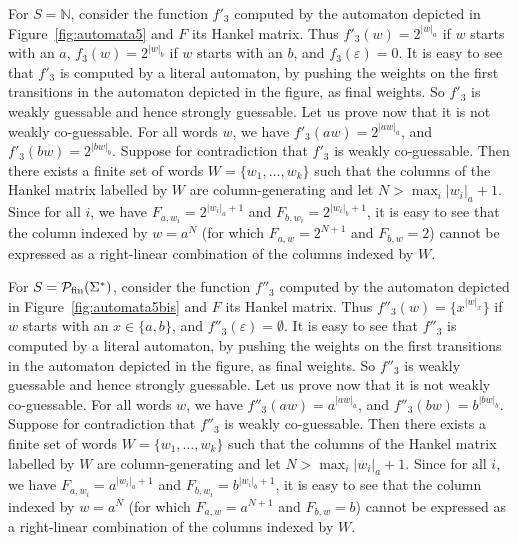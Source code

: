\documentclass[10pt,a4paper]{amsart}
\theoremstyle{definition}
\numberwithin{equation}{section}
\numberwithin{theorem}{section}
\begin{document}
	For $S=\mathbb{N}$, consider the function $f'_3$ computed by the automaton depicted in Figure~\ref{fig:automata5} and $F$ its Hankel matrix. Thus $f'_3(w) = 2^{|w|_a}$ if $w$ starts with an $a$, $f_3(w) = 2^{|w|_b}$ if $w$ starts with an $b$, and $f_3(\varepsilon) = 0$. It is easy to see that $f'_3$ is computed by a literal automaton, by pushing the weights on the first transitions in the automaton depicted in the figure, as final weights. So $f'_3$ is weakly guessable and hence strongly guessable. Let us prove now that it is not weakly co-guessable. For all words $w$, we have $f'_3(aw) = 2^{|aw|_a}$, and $f'_3(bw) = 2^{|bw|_b}$. Suppose for contradiction that $f'_3$ is weakly co-guessable. Then there exists a finite set of words $W=\{w_1, \ldots ,w_k\}$ such that the columns of the Hankel matrix labelled by $W$ are column-generating and let $N> \max_i|w_i|_a + 1$. Since for all $i$, we have $F_{a, w_i} = 2^{|w_i|_a + 1}$ and $F_{b, w_i} = 2^{|w_i|_b+1}$, it is easy to see that the column indexed by $w = a^N$ (for which $F_{a, w} = 2^{N+1}$ and $F_{b, w} = 2$) cannot be expressed as a right-linear combination of the columns indexed by $W$.
	
	For $S=\mathcal{P}_{\rm fin}(\Sigma^*)$, consider the function $f''_3$ computed by the automaton depicted in Figure~\ref{fig:automata5bis} and $F$ its Hankel matrix. Thus $f''_3(w) = \{x^{|w|_x}\}$ if $w$ starts with an $x \in \{a,b\}$, and $f''_3(\varepsilon) = \emptyset$. It is easy to see that $f''_3$ is computed by a literal automaton, by pushing the weights on the first transitions in the automaton depicted in the figure, as final weights. So $f''_3$ is weakly guessable and hence strongly guessable. Let us prove now that it is not weakly co-guessable. For all words $w$, we have $f''_3(aw) = a^{|aw|_a}$, and $f''_3(bw) = b^{|bw|_b}$. Suppose for contradiction that $f''_3$ is weakly co-guessable. Then there exists a finite set of words $W=\{w_1, \ldots ,w_k\}$ such that the columns of the Hankel matrix labelled by $W$ are column-generating and let $N> \max_i|w_i|_a + 1$. Since for all $i$, we have $F_{a, w_i} = a^{|w_i|_a + 1}$ and $F_{b, w_i} = b^{|w_i|_b+1}$, it is easy to see that the column indexed by $w = a^N$ (for which $F_{a, w} = a^{N+1}$ and $F_{b, w} = b$) cannot be expressed as a right-linear combination of the columns indexed by $W$.
	
\end{document}
